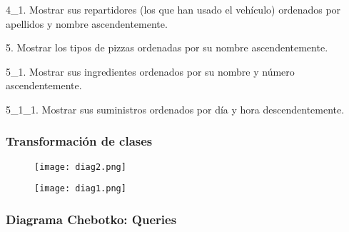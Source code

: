 \documentclass[a4paper]{article}
\begin{document}
\vspace{1.5mm}

\hspace{4mm}4\_1. Mostrar sus repartidores (los que han usado el vehículo) ordenados por apellidos y nombre ascendentemente.

\vspace{1.5mm}5. Mostrar los tipos de pizzas ordenadas por su nombre ascendentemente.

\vspace{1.5mm}

\hspace{4mm}5\_1. Mostrar sus ingredientes ordenados por su nombre y número ascendentemente.

\vspace{1.5mm}

\hspace{12mm}5\_1\_1. Mostrar sus suministros ordenados por día y hora descendentemente.

\newpage

\subsubsection{\Large{Transformación de clases}}

\begin{figure}[H]
    \centering    \texttt{[image: diag2.png]}
    \label{fig:Diagrama3_1}
\end{figure}

\begin{figure}[H]
    \centering    \texttt{[image: diag1.png]}
    \label{fig:Diagrama3_2}
\end{figure}

\vspace{2mm}

\newpage

\subsubsection{\Large{Diagrama Chebotko: Queries}}
\end{document}
